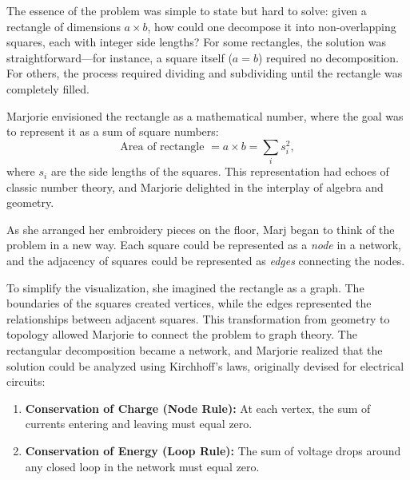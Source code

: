 
The essence of the problem was simple to state but hard to solve: given a rectangle of dimensions \(a \times b\), how could one decompose it into non-overlapping squares, each with integer side lengths? For some rectangles, the solution was straightforward—for instance, a square itself (\(a = b\)) required no decomposition. For others, the process required dividing and subdividing until the rectangle was completely filled.

Marjorie envisioned the rectangle as a mathematical number, where the goal was to represent it as a sum of square numbers:
\[
\text{Area of rectangle } = a \times b = \sum_{i} s_i^2,
\]
where \(s_i\) are the side lengths of the squares. This representation had echoes of classic number theory, and Marjorie delighted in the interplay of algebra and geometry.


As she arranged her embroidery pieces on the floor, Marj began to think of the problem in a new way. Each square could be represented as a \textit{node} in a network, and the adjacency of squares could be represented as \textit{edges} connecting the nodes. 

To simplify the visualization, she imagined the rectangle as a graph. The boundaries of the squares created vertices, while the edges represented the relationships between adjacent squares. This transformation from geometry to topology allowed Marjorie to connect the problem to graph theory. The rectangular decomposition became a network, and Marjorie realized that the solution could be analyzed using Kirchhoff’s laws, originally devised for electrical circuits:

\begin{enumerate}
    \item \textbf{Conservation of Charge (Node Rule):} At each vertex, the sum of currents entering and leaving must equal zero.
    \item \textbf{Conservation of Energy (Loop Rule):} The sum of voltage drops around any closed loop in the network must equal zero.
\end{enumerate}

